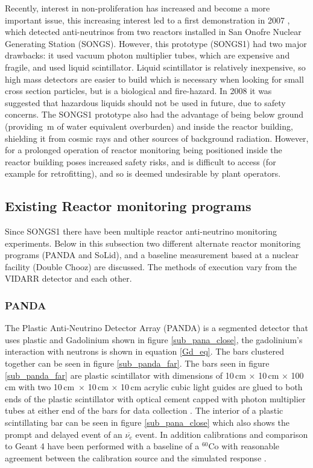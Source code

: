 \documentclass[12pt,a4paper]{article}
\begin{document}
Recently, interest in non-proliferation has increased and become a more important issue, this increasing interest led to a first demonstration in 2007  \cite{songs_s1}, which detected anti-neutrinos from two reactors installed in San Onofre Nuclear Generating Station (SONGS). However, this prototype (SONGS1) had two major drawbacks: it used vacuum photon multiplier tubes, which are expensive and fragile, and used liquid scintillator. Liquid scintillator is relatively inexpensive, so high mass detectors are easier to build which is necessary when looking for small cross section particles, but is a biological and fire-hazard. In 2008 \cite{IAEA_bio_fire_report} it was suggested that hazardous liquids should not be used in future, due to safety concerns. The SONGS1 prototype also had the advantage of being below ground (providing \,m of water equivalent overburden\cite{songs_s1}) and inside the reactor building, shielding it from cosmic rays and other sources of background radiation. However, for a prolonged operation of reactor monitoring being positioned inside the reactor building poses increased safety risks, and is difficult to access (for example for retrofitting), and so is deemed undesirable by plant operators. 



\subsection{Existing Reactor monitoring programs}
Since SONGS1 there have been multiple reactor anti-neutrino monitoring experiments. Below in this subsection two different alternate reactor monitoring programs (PANDA and SoLid), and a baseline measurement based at a nuclear facility (Double Chooz) are discussed. The methods of execution vary from the VIDARR detector and each other. 
\subsubsection{PANDA}
The Plastic Anti-Neutrino Detector Array (PANDA) is a segmented detector that uses plastic and Gadolinium shown in figure \ref{sub_pana_close}, the gadolinium's interaction with neutrons is shown in equation \ref{Gd_eq}. The bars clustered together can be seen in figure \ref{sub_panda_far}. The bars seen in figure \ref{sub_panda_far} are plastic scintillator with dimensions of 10\,cm $\times$ 10\,cm $\times$ 100\,cm with two 10\,cm\ $\times$ 10\,cm $\times$ 10\,cm acrylic cubic light guides are glued to both ends of the plastic scintillator with optical cement capped with photon multiplier tubes at either end of the bars for data collection \cite{PANDA_2014}. The interior of a plastic scintillating bar can be seen in figure \ref{sub_pana_close} which also shows the prompt and delayed event of an $\overline{\nu_e}$ event. In addition calibrations and comparison to Geant 4 \cite{geant4_ref} have been performed with a baseline of a $^{60}$Co with reasonable agreement between the calibration source and the simulated response \cite{PANDA_2012}. 
\end{document}
